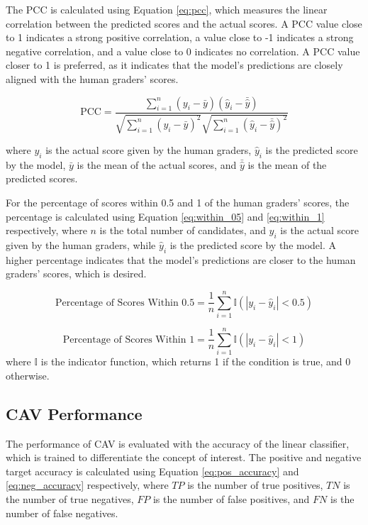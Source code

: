 The PCC is calculated using Equation \ref{eq:pcc}, which measures the linear correlation between the predicted scores and the actual scores. A PCC value close to 1 indicates a strong positive correlation, a value close to -1 indicates a strong negative correlation, and a value close to 0 indicates no correlation. A PCC value closer to 1 is preferred, as it indicates that the model's predictions are closely aligned with the human graders' scores.

\begin{equation} \label{eq:pcc}
    \text{PCC} = \frac{\sum_{i=1}^{n} (y_i - \bar{y})(\hat{y}_i - \bar{\hat{y}})}{\sqrt{\sum_{i=1}^{n} (y_i - \bar{y})^2} \sqrt{\sum_{i=1}^{n} (\hat{y}_i - \bar{\hat{y}})^2}}
\end{equation}

where $y_i$ is the actual score given by the human graders, $\hat{y}_i$ is the predicted score by the model, $\bar{y}$ is the mean of the actual scores, and $\bar{\hat{y}}$ is the mean of the predicted scores.

For the percentage of scores within 0.5 and 1 of the human graders' scores, the percentage is calculated using Equation \ref{eq:within_05} and \ref{eq:within_1} respectively, where $n$ is the total number of candidates, and $y_i$ is the actual score given by the human graders, while $\hat{y}_i$ is the predicted score by the model. A higher percentage indicates that the model's predictions are closer to the human graders' scores, which is desired.

\begin{equation} \label{eq:within_05}
    \text{Percentage of Scores Within 0.5} = \frac{1}{n} \sum_{i=1}^{n} \mathbb{I}(|y_i - \hat{y}_i| < 0.5)
\end{equation}

\begin{equation} \label{eq:within_1}
    \text{Percentage of Scores Within 1} = \frac{1}{n} \sum_{i=1}^{n} \mathbb{I}(|y_i - \hat{y}_i| < 1)
\end{equation}
where $\mathbb{I}$ is the indicator function, which returns 1 if the condition is true, and 0 otherwise.

\subsection{CAV Performance}
The performance of CAV is evaluated with the accuracy of the linear classifier, which is trained to differentiate the concept of interest. The positive and negative target accuracy is calculated using Equation \ref{eq:pos_accuracy} and \ref{eq:neg_accuracy} respectively, where $TP$ is the number of true positives, $TN$ is the number of true negatives, $FP$ is the number of false positives, and $FN$ is the number of false negatives.

